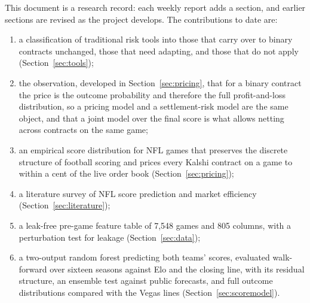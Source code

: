 This document is a research record: each weekly report adds a section, and earlier sections are revised as the project develops. The contributions to date are:
\begin{enumerate}[nosep]
\item a classification of traditional risk tools into those that carry over to binary contracts unchanged, those that need adapting, and those that do not apply (Section~\ref{sec:tools});
\item the observation, developed in Section~\ref{sec:pricing}, that for a binary contract the price is the outcome probability and therefore the full profit-and-loss distribution, so a pricing model and a settlement-risk model are the same object, and that a joint model over the final score is what allows netting across contracts on the same game;
\item an empirical score distribution for NFL games that preserves the discrete structure of football scoring and prices every Kalshi contract on a game to within a cent of the live order book (Section~\ref{sec:pricing});
\item a literature survey of NFL score prediction and market efficiency (Section~\ref{sec:literature});
\item a leak-free pre-game feature table of 7,548 games and 805 columns, with a perturbation test for leakage (Section~\ref{sec:data});
\item a two-output random forest predicting both teams' scores, evaluated walk-forward over sixteen seasons against Elo and the closing line, with its residual structure, an ensemble test against public forecasts, and full outcome distributions compared with the Vegas lines (Section~\ref{sec:scoremodel}).
\end{enumerate}
